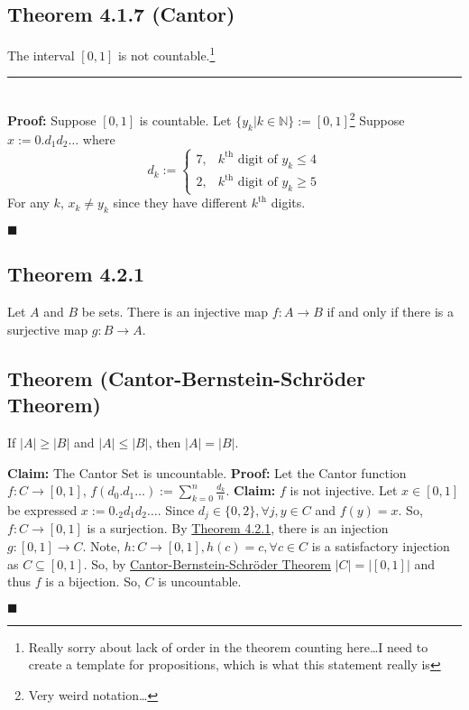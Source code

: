 \documentclass[11pt]{book}
\newcommand{\N}{\mathbb{N}}
\newcommand{\horline}{\noindent\rule{14.25cm}{0.6pt}\\}
\newcounter{theorem}
\newcommand{\QED}{\begin{flushright}$\blacksquare$\end{flushright}}
\begin{document}
	\subsection{Theorem 4.1.7 (Cantor)}
	\label{subsec:theor417}
		\begin{theor}
			The interval $[0,1]$ is not countable.\footnote{Really sorry about lack of order in the theorem counting here\dots I need to create a template for propositions, which is what this statement really is}\hfill\break
			\horline
			\textbf{Proof:} Suppose $[0,1]$ is countable. Let $\{y_k | k \in \N\} := [0,1]$\footnote{Very weird notation\dots} Suppose $x := 0.d_1d_2\dots$ where
			$$d_k := \begin{cases} 7 ,& k^{\text{th}} \text{ digit of } y_k \leq 4\\ 2 ,& k^{\text{th}} \text{ digit of } y_k \geq 5 \end{cases}$$
				For any $k$, $x_k \neq y_k$ since they have different $k^{\text{th}}$ digits. \QED
		\end{theor}
	\subsection{Theorem 4.2.1}
	\label{subsec:theor421}
		\begin{theor}
			Let $A$ and $B$ be sets. There is an injective map $f:A \to B$ if and only if there is a surjective map $g: B \to A$. 
		\end{theor}
	\subsection{Theorem (Cantor-Bernstein-Schr{\"o}der Theorem)}
	\label{subsec:CBST}
		\begin{theor}
			If $|A| \geq |B|$ and $|A| \leq |B|$, then $|A| = |B|$.
		\end{theor}
		\begin{examp}
			\textbf{Claim:} The Cantor Set is uncountable.
			\textbf{Proof:} Let the Cantor function $f: C \to [0,1]$, $f(d_0.d_1\dots) := \displaystyle\sum_{k = 0}^n{\frac{d_k}{n}}$.\hfill\break
			\textbf{Claim:} $f$ is not injective. Let $x \in [0,1]$ be expressed $x:= 0._2d_1d_2\dots$. Since $d_j \in \{0,2\}, \forall j, y \in C$ and $f(y) = x$.
			So, $f:C \to [0,1]$ is a surjection. By \hyperref[subsec:theor421]{Theorem 4.2.1}, there is an injection  $g:[0,1] \to C$.\hfill\break
			Note, $h: C \to [0,1], h(c) = c, \forall c \in C$ is a satisfactory injection as $C \subseteq [0,1]$. So, by \hyperref[subsec:CBST]{Cantor-Bernstein-Schr{\"o}der Theorem}
			$|C| = |[0,1]|$ and thus $f$ is a bijection. So, $C$ is uncountable. \QED
		\end{examp}
\end{document}
